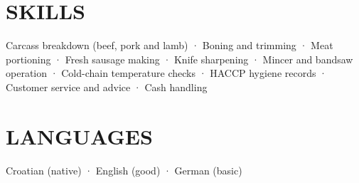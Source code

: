 \documentclass[11pt,a4paper]{article}
\begin{document}
\section*{SKILLS}
Carcass breakdown (beef, pork and lamb) · Boning and trimming · Meat portioning · Fresh sausage making · Knife sharpening · Mincer and bandsaw operation · Cold-chain temperature checks · HACCP hygiene records · Customer service and advice · Cash handling

\section*{LANGUAGES}
Croatian (native) · English (good) · German (basic)
\end{document}

